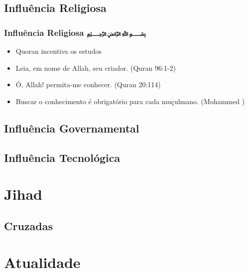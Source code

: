 \documentclass{beamer}
\begin{document}
\subsection{ Influência Religiosa }

\begin{frame} \frametitle{ Influência Religiosa \hfill \textarabic{﷽}}
	\begin{itemize}
		\item Quoran incentiva os estudos \pause
		\item Leia, em nome de Allah, seu criador. (Quran 96:1-2) \pause
		\item Ó, Allah! permita-me conhecer. (Quran 20:114) \pause
		\item Buscar o conhecimento é obrigatório para cada muçulmano. (Mohammed )
	\end{itemize}
\end{frame}

\subsection{ Influência Governamental }

\subsection{ Influência Tecnológica }
\section{Jihad}
\subsection{ Cruzadas }
\section{Atualidade}
\end{document}
